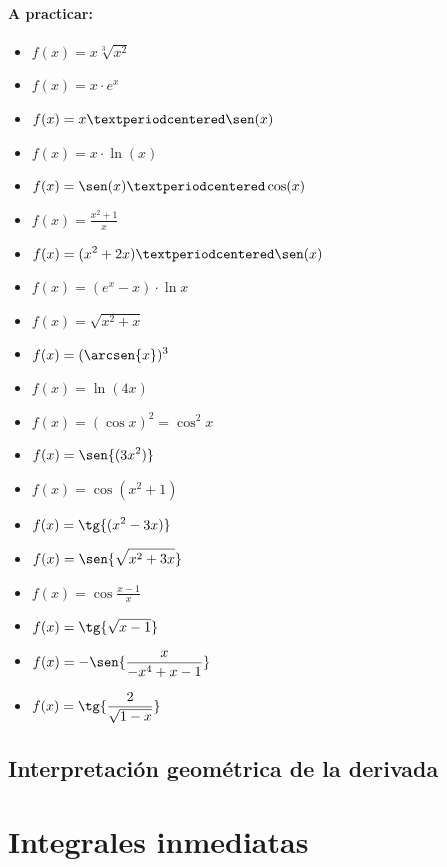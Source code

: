 \documentclass[palatino,nosec]{Docencia}
\begin{document}
\paragraph*{A practicar:}
\begin{itemize}
	\item $\displaystyle f(x) = x\sqrt[3]{x^2}$
	\item $\displaystyle f(x) = x·e^x$
	\item $\displaystyle f(x) = x·\sen(x)$
	\item $\displaystyle f(x) = x·\ln(x)$
	\item $\displaystyle f(x) = \sen(x)·\cos(x)$
	\item $\displaystyle f(x) = \frac{x^2+1}{x}$
	\item $\displaystyle f(x) = (x^2+2x)·\sen(x)$
	\item $\displaystyle f(x) = (e^x - x)·\ln{x}$
	\item $\displaystyle f(x) = \sqrt{x^2+x}$
	\item $\displaystyle f(x) = (\arcsen{x})^3$
	\item $\displaystyle f(x) = \ln(4x)$
	\item $\displaystyle f(x) = (\cos{x})^2 = \cos^2{x}$
	\item $\displaystyle f(x) = \sen{(3x^2)}$
	\item $\displaystyle f(x) = \cos{(x^2+1)} $
	\item $\displaystyle f(x) = \tg{(x^2-3x)}$
	\item $\displaystyle f(x) = \sen{\sqrt{x^2+3x}} $
	\item $\displaystyle f(x) =  \cos{\frac{x-1}{x}}$
	\item $\displaystyle f(x) = \tg{\sqrt{x-1}} $
	\item $\displaystyle f(x) = -\sen{\frac{x}{-x^4+x-1}} $
	\item $\displaystyle f(x) = \tg{\frac{2}{\sqrt{1-x}}} $
\end{itemize}

\subsection{Interpretación geométrica de la derivada}



\section{Integrales inmediatas}
\end{document}
